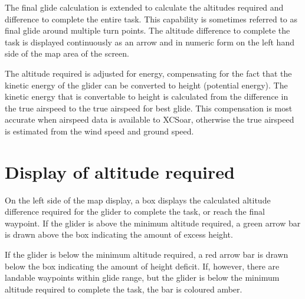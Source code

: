 The final glide calculation is extended to calculate the altitudes
required and difference to complete the entire task.  This capability
is sometimes referred to as final glide around multiple turn points.
The altitude difference to complete the task is displayed continuously
as an arrow and in numeric form on the left hand side of the map area
of the screen.

The altitude required is adjusted for energy, compensating for
the fact that the kinetic energy of the glider can be converted to
height (potential energy).  The kinetic energy that is convertable to
height is calculated from the difference in the true airspeed to the
true airspeed for best glide.  This compensation is most accurate when
airspeed data is available to XCSoar, otherwise the true airspeed is
estimated from the wind speed and ground speed.


\section{Display of altitude required}

On the left side of the map display, a box displays the calculated
altitude difference required for the glider to complete the task, or
reach the final waypoint.  If the glider is above the minimum altitude
required, a green arrow bar is drawn above the box indicating the
amount of excess height.

If the glider is below the minimum altitude required, a red arrow bar is
drawn below the box indicating the amount of height deficit.  If,
however, there are landable waypoints within glide range, but the
glider is below the minimum altitude required to complete the task, the
bar is coloured amber.

